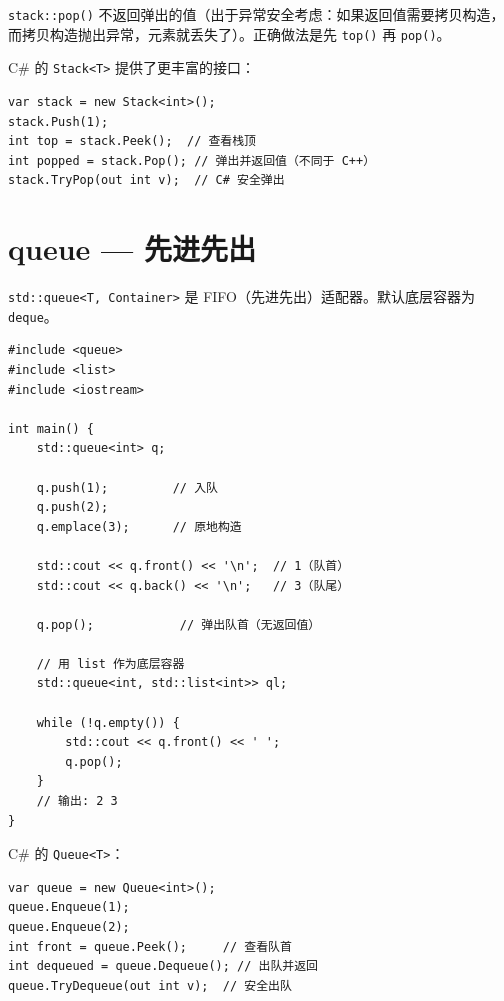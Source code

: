 \documentclass[12pt,a4paper,fontset=fandol]{ctexbook}
\newcommand{\Tp}[1]{\texttt{#1}}
\begin{document}
\begin{note}
\texttt{stack::pop()} 不返回弹出的值（出于异常安全考虑：如果返回值需要拷贝构造，
而拷贝构造抛出异常，元素就丢失了）。正确做法是先 \Tp{top()} 再 \Tp{pop()}。
\end{note}

\begin{compare}
C\# 的 \texttt{Stack<T>} 提供了更丰富的接口：
\begin{lstlisting}[style=csharpstyle]
var stack = new Stack<int>();
stack.Push(1);
int top = stack.Peek();  // 查看栈顶
int popped = stack.Pop(); // 弹出并返回值（不同于 C++）
stack.TryPop(out int v);  // C# 安全弹出
\end{lstlisting}
\end{compare}

\chapter{queue --- 先进先出}

\Tp{std::queue<T, Container>} 是 FIFO（先进先出）适配器。默认底层容器为 \Tp{deque}。

\begin{lstlisting}
#include <queue>
#include <list>
#include <iostream>

int main() {
    std::queue<int> q;

    q.push(1);         // 入队
    q.push(2);
    q.emplace(3);      // 原地构造

    std::cout << q.front() << '\n';  // 1（队首）
    std::cout << q.back() << '\n';   // 3（队尾）

    q.pop();            // 弹出队首（无返回值）

    // 用 list 作为底层容器
    std::queue<int, std::list<int>> ql;

    while (!q.empty()) {
        std::cout << q.front() << ' ';
        q.pop();
    }
    // 输出: 2 3
}
\end{lstlisting}

\begin{compare}
C\# 的 \texttt{Queue<T>}：
\begin{lstlisting}[style=csharpstyle]
var queue = new Queue<int>();
queue.Enqueue(1);
queue.Enqueue(2);
int front = queue.Peek();     // 查看队首
int dequeued = queue.Dequeue(); // 出队并返回
queue.TryDequeue(out int v);  // 安全出队
\end{lstlisting}
\end{compare}
\end{document}
